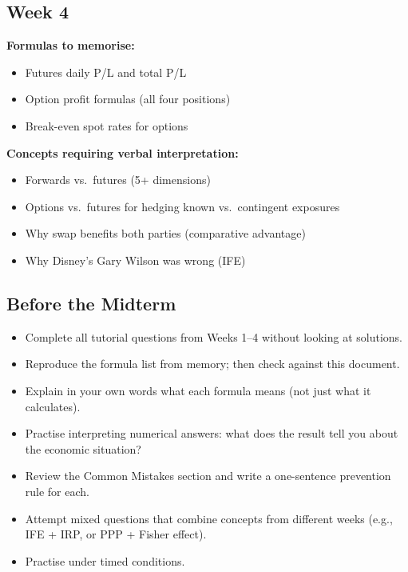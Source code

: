 \documentclass[11pt,a4paper]{article}
\newcommand{\cb}{\(\square\)\enspace}
\begin{document}
\subsection*{Week 4}

\textbf{Formulas to memorise:}
\begin{itemize}[leftmargin=2em]
  \item[\cb] Futures daily P/L and total P/L
  \item[\cb] Option profit formulas (all four positions)
  \item[\cb] Break-even spot rates for options
\end{itemize}

\textbf{Concepts requiring verbal interpretation:}
\begin{itemize}[leftmargin=2em]
  \item[\cb] Forwards vs.\ futures (5+ dimensions)
  \item[\cb] Options vs.\ futures for hedging known vs.\ contingent exposures
  \item[\cb] Why swap benefits both parties (comparative advantage)
  \item[\cb] Why Disney's Gary Wilson was wrong (IFE)
\end{itemize}

\subsection*{Before the Midterm}

\begin{itemize}[leftmargin=2em]
  \item[\cb] Complete all tutorial questions from Weeks 1--4 without looking at solutions.
  \item[\cb] Reproduce the formula list from memory; then check against this document.
  \item[\cb] Explain in your own words what each formula means (not just what it calculates).
  \item[\cb] Practise interpreting numerical answers: what does the result tell you about the economic situation?
  \item[\cb] Review the Common Mistakes section and write a one-sentence prevention rule for each.
  \item[\cb] Attempt mixed questions that combine concepts from different weeks (e.g., IFE + IRP, or PPP + Fisher effect).
  \item[\cb] Practise under timed conditions.
\end{itemize}
\end{document}
